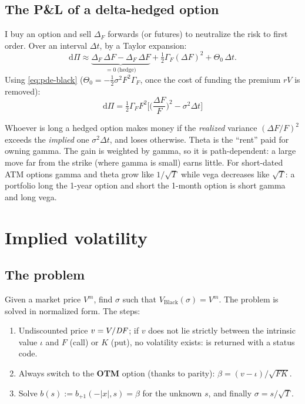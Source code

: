 \subsection{The P\&L of a delta-hedged option}
I buy an option and sell $\Delta_F$ forwards (or futures) to neutralize the risk to first order. Over an interval
$\Delta t$, by a Taylor expansion:
\[
\mathrm{d}\Pi\approx\underbrace{\Delta_F\,\Delta F-\Delta_F\,\Delta F}_{=0\ \text{(hedge)}}+\tfrac12\Gamma_F(\Delta F)^2+\Theta_0\,\Delta t .
\]
Using \eqref{eq:pde-black} ($\Theta_0=-\frac12\sigma^2F^2\Gamma_F$, once the cost of funding the premium $rV$ is
removed):
\begin{equation}\label{eq:pnl-gamma}
\boxed{\mathrm{d}\Pi=\tfrac12\Gamma_F F^2\Big[\Big(\frac{\Delta F}{F}\Big)^2-\sigma^2\Delta t\Big]}
\end{equation}
\begin{idea}[title={Key idea: ``gamma pays for theta''}]
Whoever is long a hedged option makes money if the \emph{realized} variance $(\Delta F/F)^2$ exceeds the
\emph{implied} one $\sigma^2\Delta t$, and loses otherwise. Theta is the ``rent'' paid for owning gamma. The gain is
weighted by gamma, so it is path-dependent: a large move far from the strike (where gamma is small) earns little.
For short-dated ATM options gamma and theta grow like $1/\sqrt T$ while vega decreases like $\sqrt T$: a portfolio
long the 1-year option and short the 1-month option is short gamma and long vega.
\end{idea}

\section{Implied volatility}
\subsection{The problem}
Given a market price $V^m$, find $\sigma$ such that $V_{\text{Black}}(\sigma)=V^m$. The problem is solved in
normalized form. The steps:
\begin{enumerate}
\item Undiscounted price $v=V/\mathit{DF}$; if $v$ does not lie strictly between the intrinsic value $\iota$ and $F$ (call)
or $K$ (put), no volatility exists:  is returned with a status code.
\item Always switch to the \textbf{OTM} option (thanks to parity): $\beta=(v-\iota)/\sqrt{FK}$.
\item Solve $b(s):=b_{+1}(-|x|,s)=\beta$ for the unknown $s$, and finally $\sigma=s/\sqrt T$.
\end{enumerate}

